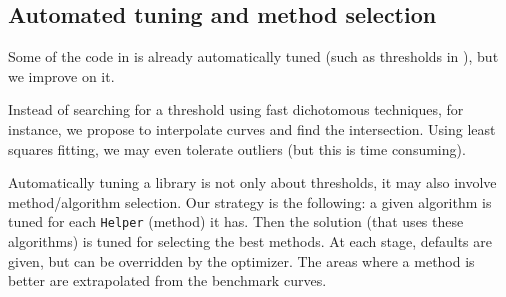 \subsection{Automated tuning and method selection}
%
Some of the code in \linbox is already automatically tuned (such as thresholds
in \fgemm), but we improve on it.



Instead of searching for a
threshold using fast dichotomous techniques, for instance, we propose to
interpolate curves and find the intersection. Using least squares fitting, we
may even tolerate outliers (but this is time consuming).
%
\par
%
Automatically tuning a library is not only about thresholds, it may
also involve method/algorithm selection. Our strategy is the following: a given
algorithm is tuned for each {\tt Helper} (method) it has.  Then the solution
(that uses these algorithms) is tuned for selecting the best methods.  At each
stage, defaults are given, but can be overridden by the optimizer. The areas
where a method is better are extrapolated from the benchmark curves.
